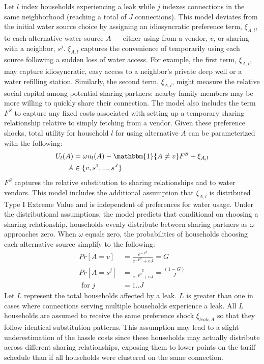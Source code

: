 \documentclass[12pt]{article}
\begin{document}
Let $l$ index households experiencing a leak while $j$ indexes connections in the same neighborhood (reaching a total of $J$ connections).  This model deviates from the initial water source choice by assigning an idiosyncratic preference term, $\xi_{A,l}$, to each alternative water source $A$ --- either using from a vendor, $v$, or sharing with a neighbor, $s^{j}$.  $\xi_{A,l}$ captures the convenience of temporarily using each source following a sudden loss of water access.  For example, the first term, $\xi_{A,l}$, may capture idiosyncratic, easy access to a neighbor's private deep well or a water refilling station.  Similarly, the second term, $\xi_{A,l}$, might measure the relative social capital among potential sharing partners: nearby family members may be more willing to quickly share their connection.  The model also includes the term $F^{S}$ to capture any fixed costs associated with setting up a temporary sharing relationship relative to simply fetching from a vendor.  Given these preference shocks, total utility for household $l$ for using alternative $A$ can be parameterized with the following:
\begin{align}\label{equation:hassleutilities} 
\begin{split}
U_{l}(A) &= \omega u_{l}(A) - \mathbbm{1}\{ A \neq v \} F^{S}  + \xi_{A,l} \\
A & \in \{v,s^{1},...,s^{J}\}
\end{split}
\end{align}
$F^{S}$ captures the relative substitution to sharing relationships and to water vendors.  This model includes the additional assumption that $\xi_{A,l}$ is distributed Type I Extreme Value and is independent of preferences for water usage.  Under the distributional assumptions, the model predicts that conditional on choosing a sharing relationship, households evenly distribute between sharing partners as $\omega$ approaches zero.  When $\omega$ equals zero, the probabilities of households choosing each alternative source simplify to the following:
\begin{align*}
Pr[A=v] &= \frac{e^{-F^{S}}}{e^{-F^{S}}+e J} = G \\
Pr[A=s^{j}] &= \frac{e}{e^{-F^{S}}+eJ} = \frac{(1-G)}{J}  \\
\text{ for } j &= 1..J
\end{align*}
Let $L$ represent the total households affected by a leak.  $L$ is greater than one in cases where connections serving multiple households experience a leak.  All $L$ households are assumed to receive the same preference shock $\xi_{leak,A}$ so that they follow identical substitution patterns.  This assumption may lead to a slight underestimation of the hassle costs since these households may actually distribute across different sharing relationships, exposing them to lower points on the tariff schedule than if all households were clustered on the same connection.
\end{document}
